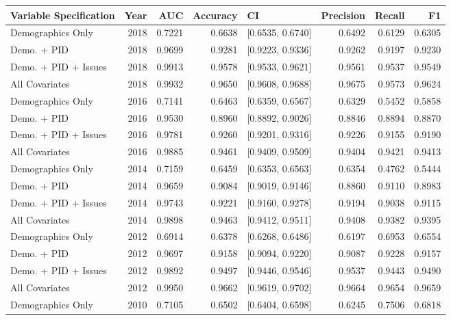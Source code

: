 \begin{table}[ht]
\centering
\begin{tabular}{lrrrlrrr}
  \toprule
Variable Specification & Year & AUC & Accuracy & CI & Precision & Recall & F1 \\ 
  \midrule
Demographics Only & 2018 & 0.7221 & 0.6638 & [0.6535, 0.6740] & 0.6492 & 0.6129 & 0.6305 \\ 
  Demo. + PID & 2018 & 0.9699 & 0.9281 & [0.9223, 0.9336] & 0.9262 & 0.9197 & 0.9230 \\ 
  Demo. + PID + Issues & 2018 & 0.9913 & 0.9578 & [0.9533, 0.9621] & 0.9561 & 0.9537 & 0.9549 \\ 
  All Covariates & 2018 & 0.9932 & 0.9650 & [0.9608, 0.9688] & 0.9675 & 0.9573 & 0.9624 \\ 
  Demographics Only & 2016 & 0.7141 & 0.6463 & [0.6359, 0.6567] & 0.6329 & 0.5452 & 0.5858 \\ 
  Demo. + PID & 2016 & 0.9530 & 0.8960 & [0.8892, 0.9026] & 0.8846 & 0.8894 & 0.8870 \\ 
  Demo. + PID + Issues & 2016 & 0.9781 & 0.9260 & [0.9201, 0.9316] & 0.9226 & 0.9155 & 0.9190 \\ 
  All Covariates & 2016 & 0.9885 & 0.9461 & [0.9409, 0.9509] & 0.9404 & 0.9421 & 0.9413 \\ 
  Demographics Only & 2014 & 0.7159 & 0.6459 & [0.6353, 0.6563] & 0.6354 & 0.4762 & 0.5444 \\ 
  Demo. + PID & 2014 & 0.9659 & 0.9084 & [0.9019, 0.9146] & 0.8860 & 0.9110 & 0.8983 \\ 
  Demo. + PID + Issues & 2014 & 0.9743 & 0.9221 & [0.9160, 0.9278] & 0.9194 & 0.9038 & 0.9115 \\ 
  All Covariates & 2014 & 0.9898 & 0.9463 & [0.9412, 0.9511] & 0.9408 & 0.9382 & 0.9395 \\ 
  Demographics Only & 2012 & 0.6914 & 0.6378 & [0.6268, 0.6486] & 0.6197 & 0.6953 & 0.6554 \\ 
  Demo. + PID & 2012 & 0.9697 & 0.9158 & [0.9094, 0.9220] & 0.9087 & 0.9228 & 0.9157 \\ 
  Demo. + PID + Issues & 2012 & 0.9892 & 0.9497 & [0.9446, 0.9546] & 0.9537 & 0.9443 & 0.9490 \\ 
  All Covariates & 2012 & 0.9950 & 0.9662 & [0.9619, 0.9702] & 0.9664 & 0.9654 & 0.9659 \\ 
  Demographics Only & 2010 & 0.7105 & 0.6502 & [0.6404, 0.6598] & 0.6245 & 0.7506 & 0.6818 \\ 

\end{tabular}
\end{table}
